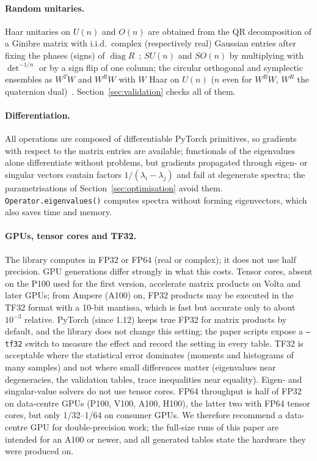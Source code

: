 \documentclass[11pt]{article}
\begin{document}
\paragraph{Random unitaries.} Haar unitaries on $U(n)$ and $O(n)$ are obtained from the QR decomposition
of a Ginibre matrix with i.i.d.\ complex (respectively real) Gaussian entries after fixing the phases (signs) of
$\operatorname{diag}R$~\cite{mezzadri2007}; $SU(n)$ and $SO(n)$ by multiplying with $\det^{-1/n}$ or by
a sign flip of one column; the circular orthogonal and symplectic ensembles as $W^TW$ and $W^RW$ with
$W$ Haar on $U(n)$ ($n$ even for $W^RW$, $W^R$ the quaternion dual)~\cite{mehta2004}. Section~\ref{sec:validation} checks all of them.

\paragraph{Differentiation.} All operations are composed of differentiable PyTorch primitives, so gradients
with respect to the matrix entries are available; functionals of the eigenvalues alone differentiate
without problems, but gradients propagated through eigen- or singular vectors contain factors
$1/(\lambda_i-\lambda_j)$ and fail at degenerate spectra; the parametrisations of Section~\ref{sec:optimisation}
avoid them. \texttt{Operator.eigenvalues()} computes spectra without forming eigenvectors, which also saves time and
memory.

\paragraph{GPUs, tensor cores and TF32.} The library computes in FP32 or FP64 (real or complex); it does not use
half precision. GPU generations differ strongly in what this costs. Tensor cores, absent on the P100 used for the
first version, accelerate matrix products on Volta and later GPUs; from Ampere (A100) on, FP32 products may be
executed in the TF32 format with a 10-bit mantissa, which is fast but accurate only to about $10^{-3}$ relative.
PyTorch (since 1.12) keeps true FP32 for matrix products by default, and the library does not change this setting;
the paper scripts expose a \texttt{--tf32} switch to measure the effect and record the setting in every table.
TF32 is acceptable where the statistical error dominates (moments and histograms of many samples) and not where
small differences matter (eigenvalues near degeneracies, the validation tables, trace inequalities near equality). Eigen- and singular-value solvers do not use
tensor cores. FP64 throughput is half of FP32 on data-centre GPUs (P100, V100, A100, H100), the latter two with FP64
tensor cores, but only 1/32--1/64 on consumer GPUs. We therefore recommend a data-centre GPU for double-precision
work; the full-size runs of this paper are intended for an A100 or newer, and all generated tables state the
hardware they were produced on.
\end{document}

